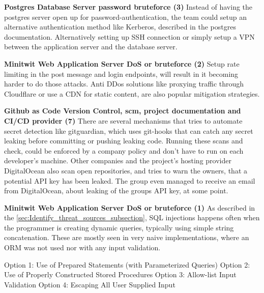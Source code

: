 \textbf{Postgres Database Server password bruteforce (3)}
Instead of having the postgres server open up for password-authentication, the team could setup an alternative authentication method like Kerberos, described in the postgres documentation\cite{postgres_auth_methods}.
Alternatively setting up SSH connection or simply setup a VPN between the application server and the database server.

\textbf{Minitwit Web Application Server DoS or bruteforce (2)}
Setup rate limiting in the post message and login endpoints, will result in it becoming harder to do those attacks. Anti DDos solutions like proxying traffic through Cloudflare or use a CDN for static content, are also popular mitigation strategies.\cite{owasp_dos_mitigation }

\textbf{Github as Code Version Control, \acrshort{scm}, project documentation and CI/CD provider (7)}
There are several mechanisms that tries to automate secret detection like gitguardian\cite{gitguardian}, which uses git-hooks that can catch any secret leaking before committing or pushing leaking code. Running these scans and check, could be enforced by a company policy and don't have to run on each developer's machine. Other companies and the project's hosting provider DigitalOcean also scan open repositories, and tries to warn the owners, that a potential API key has been leaked.\cite{github_do_scanning_partner} The group even managed to receive an email from DigitalOcean, about leaking of the groups API key, at some point.  

\textbf{Minitwit Web Application Server DoS or bruteforce (1)}
As described in the \autoref{sec:Identify_threat_sources_subsection}, SQL injections happens often when the programmer is creating dynamic queries, typically using simple string concatenation. These are mostly seen in very naive implementations, where an ORM was not used nor with any input validation.


    Option 1: Use of Prepared Statements (with Parameterized Queries)
    Option 2: Use of Properly Constructed Stored Procedures
    Option 3: Allow-list Input Validation
    Option 4: Escaping All User Supplied Input






